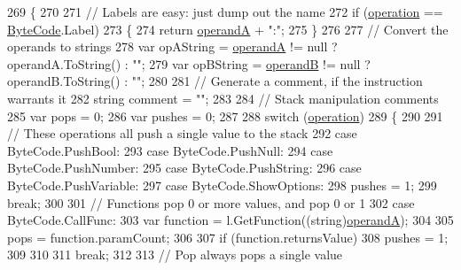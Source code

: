 \begin{DoxyCode}
269         \{
270 
271             \textcolor{comment}{// Labels are easy: just dump out the name}
272             \textcolor{keywordflow}{if} (\hyperlink{a00109_a566bf5f7198cc353ea5c3710cb3a31cb}{operation} == \hyperlink{a00041_ad5dfb6ee68ca7469623ad3e459f98894}{ByteCode}.Label)
273             \{
274                 \textcolor{keywordflow}{return} \hyperlink{a00109_ab5d386faa0d3dbc23db80f8e62706afd}{operandA} + \textcolor{stringliteral}{":"};
275             \}
276 
277             \textcolor{comment}{// Convert the operands to strings}
278             var opAString = \hyperlink{a00109_ab5d386faa0d3dbc23db80f8e62706afd}{operandA} != null ? operandA.ToString() : \textcolor{stringliteral}{""};
279             var opBString = \hyperlink{a00109_a56348c6fe7eb919b7277afc06e5b224a}{operandB} != null ? operandB.ToString() : \textcolor{stringliteral}{""};
280 
281             \textcolor{comment}{// Generate a comment, if the instruction warrants it}
282             \textcolor{keywordtype}{string} comment = \textcolor{stringliteral}{""};
283 
284             \textcolor{comment}{// Stack manipulation comments}
285             var pops = 0;
286             var pushes = 0;
287 
288             \textcolor{keywordflow}{switch} (\hyperlink{a00109_a566bf5f7198cc353ea5c3710cb3a31cb}{operation})
289             \{
290 
291                 \textcolor{comment}{// These operations all push a single value to the stack}
292                 \textcolor{keywordflow}{case} ByteCode.PushBool:
293                 \textcolor{keywordflow}{case} ByteCode.PushNull:
294                 \textcolor{keywordflow}{case} ByteCode.PushNumber:
295                 \textcolor{keywordflow}{case} ByteCode.PushString:
296                 \textcolor{keywordflow}{case} ByteCode.PushVariable:
297                 \textcolor{keywordflow}{case} ByteCode.ShowOptions:
298                     pushes = 1;
299                     \textcolor{keywordflow}{break};
300 
301                 \textcolor{comment}{// Functions pop 0 or more values, and pop 0 or 1}
302                 \textcolor{keywordflow}{case} ByteCode.CallFunc:
303                     var \textcolor{keyword}{function} = l.GetFunction((string)\hyperlink{a00109_ab5d386faa0d3dbc23db80f8e62706afd}{operandA});
304 
305                     pops = function.paramCount;
306 
307                     \textcolor{keywordflow}{if} (\textcolor{keyword}{function}.returnsValue)
308                         pushes = 1;
309 
310 
311                     \textcolor{keywordflow}{break};
312 
313                 \textcolor{comment}{// Pop always pops a single value}

\end{DoxyCode}
